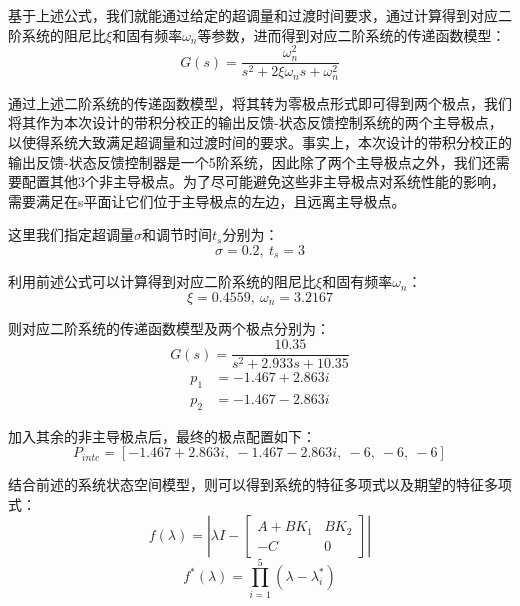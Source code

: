 \documentclass[UTF8]{article}
\begin{document}
基于上述公式，我们就能通过给定的超调量和过渡时间要求，通过计算得到对应二阶系统的阻尼比$\xi$和固有频率$\omega_n$等参数，进而得到对应二阶系统的传递函数模型：
\begin{equation*}
	G(s) = \frac{\omega_n^2}{s^2 + 2\xi\omega_ns + \omega_n^2}
\end{equation*}

通过上述二阶系统的传递函数模型，将其转为零极点形式即可得到两个极点，我们将其作为本次设计的带积分校正的输出反馈-状态反馈控制系统的两个主导极点，以使得系统大致满足超调量和过渡时间的要求。事实上，本次设计的带积分校正的输出反馈-状态反馈控制器是一个5阶系统，因此除了两个主导极点之外，我们还需要配置其他3个非主导极点。为了尽可能避免这些非主导极点对系统性能的影响，需要满足在s平面让它们位于主导极点的左边，且远离主导极点。

这里我们指定超调量$\sigma$和调节时间$t_s$分别为：
\begin{equation*}
	\sigma = 0.2,\ t_s = 3
\end{equation*}

利用前述公式可以计算得到对应二阶系统的阻尼比$\xi$和固有频率$\omega_n$：
\begin{equation*}
	\xi = 0.4559,\ \omega_n = 3.2167
\end{equation*}

则对应二阶系统的传递函数模型及两个极点分别为：
\begin{equation*}
	G(s) = \frac{10.35}{s^2 + 2.933s + 10.35}
\end{equation*}
\begin{align*}
	p_1 &= -1.467 + 2.863i \\
	p_2 &= -1.467 - 2.863i
\end{align*}

加入其余的非主导极点后，最终的极点配置如下：
\begin{equation*}
	P_{inte} = [-1.467 + 2.863i,\ -1.467 - 2.863i,\ -6,\ -6,\ -6]
\end{equation*}

结合前述的系统状态空间模型，则可以得到系统的特征多项式以及期望的特征多项式：
\begin{equation*}
	f(\lambda) = |\lambda I - \begin{bmatrix}
		A+BK_1 & BK_2 \\
		-C & 0
	\end{bmatrix}|
\end{equation*}
\begin{equation*}
	f^*(\lambda) = \prod_{i = 1}^5 (\lambda - \lambda^*_i)
\end{equation*}
\end{document}
